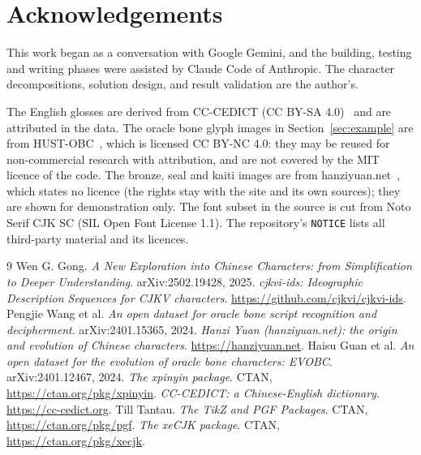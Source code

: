 \documentclass[11pt]{article}
\begin{document}
\section*{Acknowledgements}
This work began as a conversation with Google Gemini, and the building, testing and writing phases were assisted by Claude Code of Anthropic. The character decompositions, solution design, and result validation are the author's.

The English glosses are derived from CC-CEDICT (CC BY-SA 4.0)~\cite{cedict} and are attributed in the data. The oracle bone glyph images in
Section~\ref{sec:example} are from HUST-OBC~\cite{hustobc}, which is licensed CC BY-NC 4.0: they may be reused for non-commercial research with
attribution, and are not covered by the MIT licence of the code. The bronze, seal and kaiti images are from hanziyuan.net~\cite{hanziyuan}, which
states no licence (the rights stay with the site and its own sources); they are shown for demonstration only. The font subset in the source is cut from Noto Serif CJK SC (SIL Open Font License 1.1). The repository's \texttt{NOTICE} lists all third-party material and its licences.

\begin{thebibliography}{9}
 Wen G. Gong. \emph{A New Exploration into Chinese Characters: from Simplification to Deeper Understanding}. arXiv:2502.19428, 2025.
 \emph{cjkvi-ids: Ideographic Description Sequences for CJKV characters}. \url{https://github.com/cjkvi/cjkvi-ids}.
 Pengjie Wang et al. \emph{An open dataset for oracle bone script recognition and decipherment}. arXiv:2401.15365, 2024.
 \emph{Hanzi Yuan (hanziyuan.net): the origin and evolution of Chinese characters}. \url{https://hanziyuan.net}.
 Haisu Guan et al. \emph{An open dataset for the evolution of oracle bone characters: EVOBC}. arXiv:2401.12467, 2024.
 \emph{The xpinyin package}. CTAN, \url{https://ctan.org/pkg/xpinyin}.
 \emph{CC-CEDICT: a Chinese-English dictionary}. \url{https://cc-cedict.org}.
 Till Tantau. \emph{The TikZ and PGF Packages}. CTAN, \url{https://ctan.org/pkg/pgf}.
 \emph{The xeCJK package}. CTAN, \url{https://ctan.org/pkg/xecjk}.
\end{thebibliography}
\end{document}
